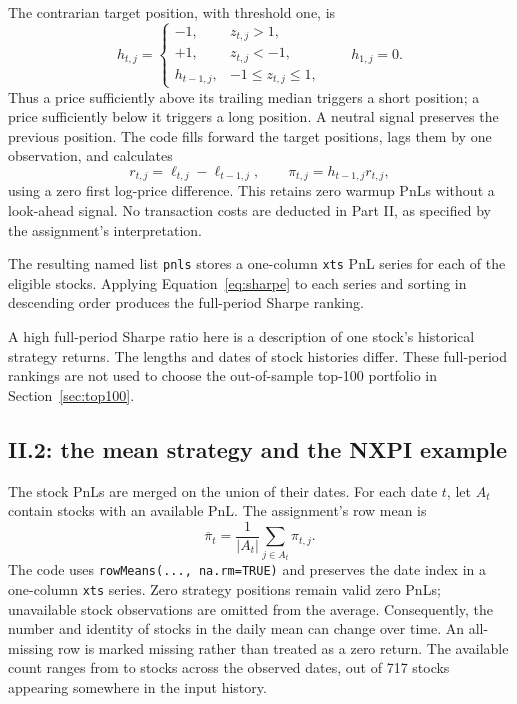 \documentclass[11pt,letterpaper]{article}
\newcommand{\smallinput}[3]{%
  \begin{table}[H]\centering
  \caption{#2}\label{#3}
  {\small}
  \end{table}}
\begin{document}
The contrarian target position, with threshold one, is
\begin{equation}
h_{t,j}=\begin{cases}
-1,&z_{t,j}>1,\\
+1,&z_{t,j}<-1,\\
h_{t-1,j},&-1\leq z_{t,j}\leq1,
\end{cases}
\qquad h_{1,j}=0.
\label{eq:hampelpositions}
\end{equation}
Thus a price sufficiently above its trailing median triggers a short
position; a price sufficiently below it triggers a long position. A neutral
signal preserves the previous position. The code fills forward the target
positions, lags them by one observation, and calculates
\begin{equation}
r_{t,j}=\ell_{t,j}-\ell_{t-1,j},\qquad
\pi_{t,j}=h_{t-1,j}r_{t,j},
\label{eq:hampelpnl}
\end{equation}
using a zero first log-price difference. This retains zero warmup PnLs
without a look-ahead signal. No transaction costs are deducted in Part II,
as specified by the assignment's interpretation.

The resulting named list \texttt{pnls} stores a one-column \texttt{xts}
PnL series for each of the \HWEligibleStocks{} eligible stocks. Applying
Equation~\ref{eq:sharpe} to
each series and sorting in descending order produces the full-period
Sharpe ranking.

\smallinput{hampel_top10.tex}{Ten largest full-period stock-level Hampel
Sharpe ratios, calculated from the available stock universe. These ranks
use each stock's own valid observation history.}{tab:topten}

A high full-period Sharpe ratio here is a description of one stock's
historical strategy returns. The lengths and dates of stock histories
differ. These full-period rankings are not used to choose the out-of-sample
top-100 portfolio in Section~\ref{sec:top100}.

\subsection{II.2: the mean strategy and the NXPI example}
The stock PnLs are merged on the union of their dates. For each date $t$,
let $A_t$ contain stocks with an available PnL. The assignment's row mean
is
\begin{equation}
\overline\pi_t=\frac{1}{|A_t|}\sum_{j\in A_t}\pi_{t,j}.
\label{eq:meanportfolio}
\end{equation}
The code uses \texttt{rowMeans(..., na.rm=TRUE)} and preserves the date index
in a one-column \texttt{xts} series. Zero strategy positions remain valid
zero PnLs; unavailable stock observations are omitted from the average.
Consequently, the number and identity of stocks in the daily mean can
change over time. An all-missing row is marked missing rather than treated
as a zero return. The available count ranges from \HWMinAvailable{} to
\HWMaxAvailable{} stocks across the observed dates, out of 717 stocks
appearing somewhere in the input history.
\end{document}
